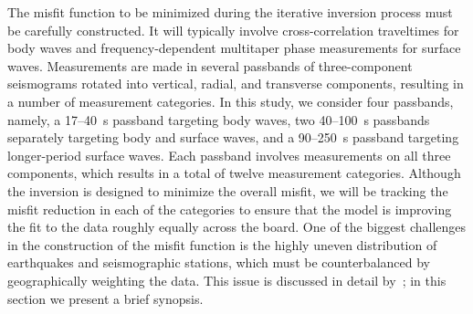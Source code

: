 \documentclass[extra,mreferee]{gji}
\begin{document}
The misfit function to be minimized during the iterative inversion process must be carefully constructed.
It will typically involve cross-correlation traveltimes for body waves and frequency-dependent multitaper phase measurements for surface waves.
Measurements are made in several passbands of three-component seismograms rotated into vertical, radial, and transverse components, resulting in a number of measurement categories.
In this study, we consider four passbands,
namely, a 17--40~s passband targeting body waves,
two 40--100~s passbands separately targeting body and surface waves,
and a 90--250~s passband targeting longer-period surface waves.
Each passband involves measurements on all three components,
which results in a total of twelve measurement categories.
Although the inversion is designed to minimize the overall misfit,
we will be tracking the misfit reduction in each of the categories to ensure that the model is improving the fit to the data roughly equally across the board.
One of the biggest challenges in the construction of the misfit function is the highly uneven distribution of earthquakes and seismographic stations,
which must be counterbalanced by geographically weighting the data.
This issue is discussed in detail by~\cite{Ruanetal2018};
in this section we present a brief synopsis.
\end{document}
